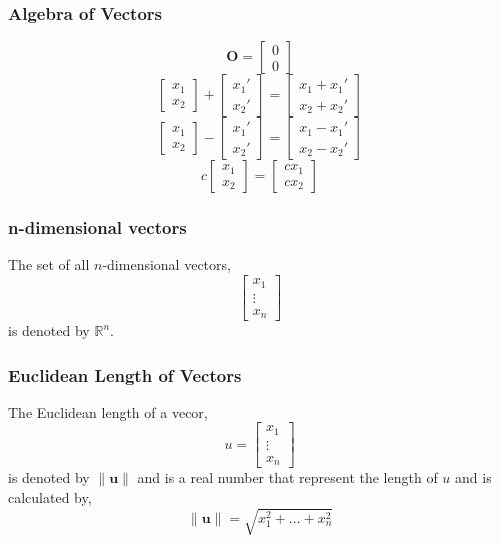 \documentclass[12pt,aspectratio=169]{beamer}
\renewcommand{\Re}{\mathbb{R}}
\begin{document}
\begin{frame}
\frametitle{Algebra of Vectors}
\[
\mathbf{O}=\begin{bmatrix}
0\\
0
\end{bmatrix}
\]\pause
\[
\begin{bmatrix}
x_1\\
x_2
\end{bmatrix}+
\begin{bmatrix}
x_1'\\
x_2'
\end{bmatrix}=\begin{bmatrix}
x_1+x_1'\\
x_2+x_2'
\end{bmatrix}
\]\pause
\[
\begin{bmatrix}
x_1\\
x_2
\end{bmatrix}-
\begin{bmatrix}
x_1'\\
x_2'
\end{bmatrix}=\begin{bmatrix}
x_1-x_1'\\
x_2-x_2'
\end{bmatrix}
\]\pause
\[
c\begin{bmatrix}
x_1\\
x_2
\end{bmatrix}=\begin{bmatrix}
cx_1\\
cx_2
\end{bmatrix}
\]
\end{frame}

\begin{frame}
\frametitle{n-dimensional vectors}
The set of all $n$-dimensional vectors,\pause
\[
\begin{bmatrix}
x_1\\
\vdots\\
x_n
\end{bmatrix}
\]\pause
is denoted by $\Re^n$.
\end{frame}

\begin{frame}
\frametitle{Euclidean Length of Vectors}
The Euclidean length of a vecor,\pause
\[u=
\begin{bmatrix}
x_1\\
\vdots\\
x_n
\end{bmatrix}
\]\pause
is denoted by $\|\mathbf{u}\|$ and is a real number that represent the length of $u$ and is calculated by,\pause
\[
\|\mathbf{u}\|=\sqrt{x_1^2+\dots +x_n^2}
\]
\end{frame}
\end{document}

